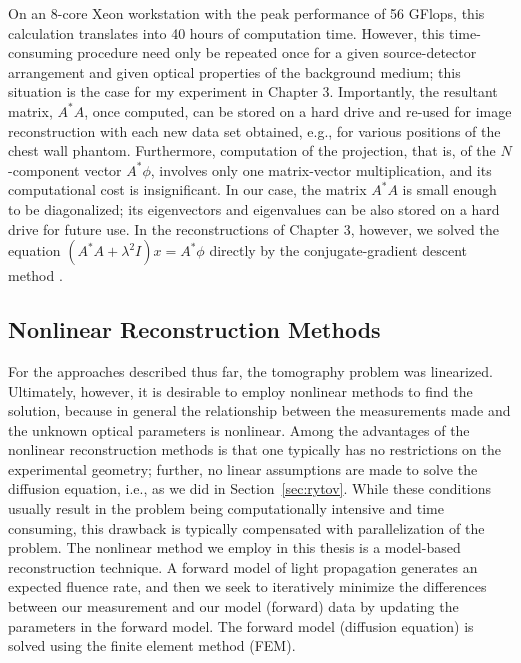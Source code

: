 On an 8-core Xeon workstation with the peak performance of 56 GFlops, this calculation translates into 40 hours of computation time. However, this time-consuming procedure need only be repeated once for a given source-detector arrangement and given optical properties of the background medium; this situation is the case for my experiment in Chapter 3. Importantly, the resultant matrix, $A^*A$, once computed, can be stored on a hard drive and re-used for image reconstruction with each new data set obtained, e.g., for various positions of the chest wall phantom.  Furthermore, computation of the projection, that is, of the $N$-component vector $A^*\phi$, involves only one matrix-vector multiplication, and its computational cost is insignificant. In our case, the matrix $A^*A$ is small enough to be diagonalized; its eigenvectors and eigenvalues can be also stored on a hard drive for future use. In the reconstructions of Chapter 3, however, we solved the equation $(A^*A+\lambda^2I)x=A^*\phi$ directly by the conjugate-gradient descent method \cite{Hestenes1952}.

\subsection{Nonlinear Reconstruction Methods}
For the approaches described thus far, the tomography problem was linearized. Ultimately, however, it is desirable to employ nonlinear methods to find the solution, because in general the relationship between the measurements made and the unknown optical parameters is nonlinear. Among the advantages of the nonlinear reconstruction methods is that one typically has no restrictions on the experimental geometry; further, no linear assumptions are made to solve the diffusion equation, i.e., as we did in Section~\ref{sec:rytov}. While these conditions usually result in the problem being computationally intensive and time consuming, this drawback is typically compensated with parallelization of the problem. The nonlinear method we employ in this thesis is a model-based reconstruction technique. A forward model of light propagation generates an expected fluence rate, and then we seek to iteratively minimize the differences between our measurement and our model (forward) data by updating the parameters in the forward model. The forward model (diffusion equation) is solved using the finite element method (FEM).
%
